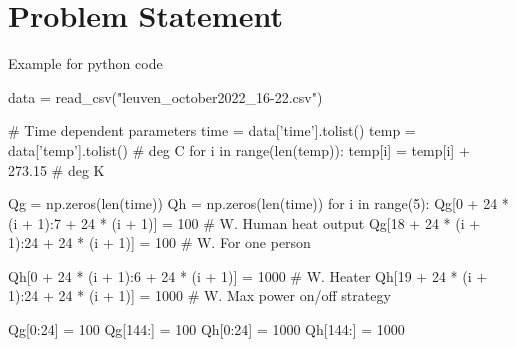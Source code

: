 \section{Problem Statement}
\label{sec:problem_statement}

Example for python code

\begin{python}
data = read_csv("leuven_october2022_16-22.csv")

# Time dependent parameters
time = data['time'].tolist()
temp = data['temp'].tolist()  # deg C
for i in range(len(temp)):
temp[i] = temp[i] + 273.15  # deg K

Qg = np.zeros(len(time))
Qh = np.zeros(len(time))
for i in range(5):
	Qg[0 + 24 * (i + 1):7 + 24 * (i + 1)] = 100  # W. Human heat output
	Qg[18 + 24 * (i + 1):24 + 24 * (i + 1)] = 100  # W. For one person

	Qh[0 + 24 * (i + 1):6 + 24 * (i + 1)] = 1000  # W. Heater
	Qh[19 + 24 * (i + 1):24 + 24 * (i + 1)] = 1000  # W. Max power on/off strategy

Qg[0:24] = 100
Qg[144:] = 100
Qh[0:24] = 1000
Qh[144:] = 1000
\end{python}
